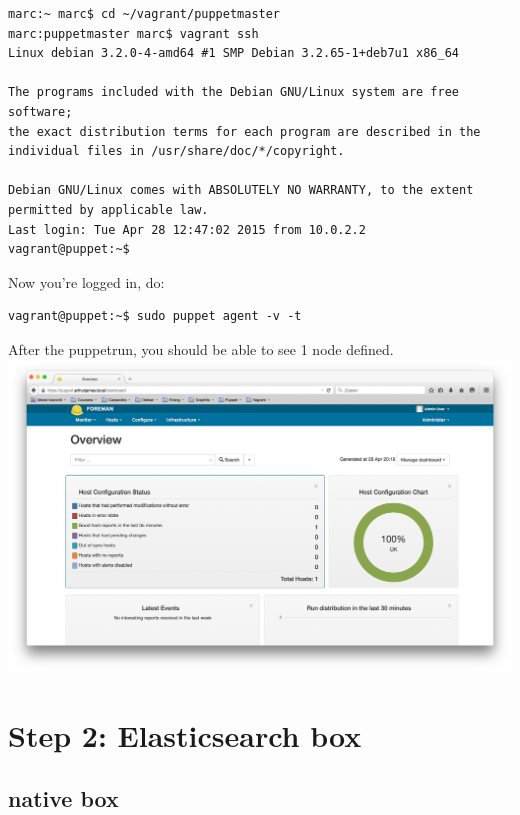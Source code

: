 \documentclass{article}
\begin{document}
\begin{verbatim}
marc:~ marc$ cd ~/vagrant/puppetmaster
marc:puppetmaster marc$ vagrant ssh
Linux debian 3.2.0-4-amd64 #1 SMP Debian 3.2.65-1+deb7u1 x86_64

The programs included with the Debian GNU/Linux system are free software;
the exact distribution terms for each program are described in the
individual files in /usr/share/doc/*/copyright.

Debian GNU/Linux comes with ABSOLUTELY NO WARRANTY, to the extent
permitted by applicable law.
Last login: Tue Apr 28 12:47:02 2015 from 10.0.2.2
vagrant@puppet:~$
\end{verbatim}

\par Now you're logged in, do:\\
\begin{verbatim}
vagrant@puppet:~$ sudo puppet agent -v -t
\end{verbatim}

After the puppetrun, you should be able to see 1 node defined.\\
\includegraphics[scale=0.3]{images/dashboard}

\section{Step 2: Elasticsearch box}
\subsection{native box}
\end{document}
